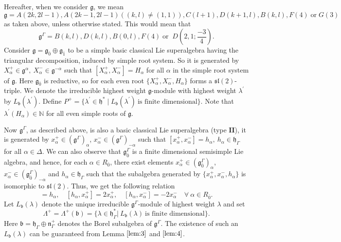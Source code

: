 \documentclass[11pt]{amsart}
\theoremstyle{plain}
\theoremstyle{definition}
\newcommand{\g}{\mathfrak{g}}
\newcommand{\h}{\mathfrak{h}}
\newcommand{\n}{\mathfrak{n}}
\begin{document}
Hereafter, when we consider $\g$, we mean \[\g=A(2k,2l-1), A(2k-1,2l-1)((k,l)\neq(1,1)), C(l+1), D(k+1,l), B(k,l), F(4)\; \mbox{or}\; G(3)\] as taken above, unless otherwise stated. This would mean that 
\[\g^{\Gamma}=B(k,l),D(k,l), B(0,l), F(4)\; \mbox{or}\;\; D\left(2,1;\frac{-3}{4}\right).\]  
Consider
$\g=\g_{\bar{0}}\oplus \g_{\bar{1}}$ to be a simple basic classical Lie superalgebra having the triangular decomposition, induced by simple root system. So it is generated by $X_{\alpha}^{+}\in\g^{\alpha},~X_{\alpha}^{-}\in\g^{-\alpha}$ such that $[X_{\alpha}^{+},X_{\alpha}^{-}]=H_{\alpha}$ for all $\alpha$ in the simple root system of $\g$. Here $\g_{\bar{0}}$ is reductive, so for each even root $\{X_{\alpha}^{+}, X_{\alpha}^{-}, H_{\alpha}\}$ forms a $\mathfrak{sl}(2)$-triple. We denote the irreducible highest weight $\g$-module with highest weight $\lambda^{'}$ by $L_{\mathfrak{b}}(\lambda^{'}).$ Define \label{pg:4} $P^+=\{\lambda^{'} \in\h^* \mid L_{\mathfrak{b}}(\lambda^{'})~ \mbox{is finite dimensional}\}.$ Note that $\lambda^{'}(H_{\alpha}) \in \mathbb{N}$ for all even simple roots of $\g.$ 
\smallskip

Now $\g^{\Gamma}$, as described above, is also a basic classical Lie superalgebra (type $\textbf{II}$), it is generated by $x_{\alpha}^{+}\in(\g^{\Gamma})_{\alpha}$, $x^{-}_{\alpha}\in(\g^{\Gamma})_{-\alpha}$ such that $[x^{+}_{\alpha},x^{-}_{\alpha}]=h_{\alpha},~h_{\alpha}\in\h_{\Gamma}$ for all $\alpha\in \Delta$. We can also observe that $\g_{\bar{0}}^{\Gamma}$ is a finite dimensional semisimple Lie algebra, and hence, for each $\alpha\in R_{\bar{0}}$, there exist elements $x^{+}_{\alpha}\in(\g_{\bar{0}}^{\Gamma})_{\alpha}$, $x_{\alpha}^{-}\in(\g_{\bar{0}}^{\Gamma})_{-\alpha}$ and $h_{\alpha}\in\h_{\Gamma}$ such that the subalgebra generated by $\{x^{+}_{\alpha},x_{\alpha}^{-},h_{\alpha}\}$ is isomorphic to $\mathfrak{sl}(2)$. Thus, we get the following relation
\begin{equation}
    [x^{+}_{\alpha},x_{\alpha}^{-}]=h_{\alpha}, \quad [h_{\alpha},x_{\alpha}^{+}]=2x_{\alpha}^{+}, \quad [h_{\alpha},x_{\alpha}^{-}]=-2x_{\alpha}^{-} \quad \forall~\alpha\in R_{\bar{0}}.
\end{equation}
Let $L_\mathfrak{b}(\lambda)$ denote the unique irreducible $\g^{\Gamma}$-module of highest weight $\lambda$ and set
\begin{equation*}
\Lambda^+=\Lambda^+(\mathfrak{b})=\{\lambda\in\h^*_{\Gamma}|~L_\mathfrak{b}(\lambda)~ \mbox{is finite dimensional}\}.
\end{equation*}
Here $\mathfrak{b}=\h_{\Gamma}\oplus \n^+_{\Gamma}$ denotes the Borel subalgebra of $\g^{\Gamma}$. The existence of such an $L_{\mathfrak{b}}(\lambda)$ can be guaranteed from Lemma $\ref{lem:3}$ and $\ref{lem:4}$.
\end{document}
